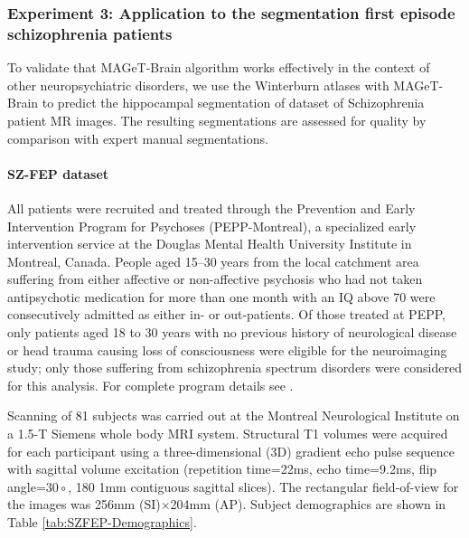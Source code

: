 \documentclass{article}\usepackage{graphicx, color}
\newcommand{\mb}{MAGeT-Brain }
\newcommand{\FEPdataset}{SZ-FEP }
\begin{document}
\subsubsection{Experiment 3: Application to the segmentation first episode
schizophrenia patients}
 
To validate that \mb algorithm works effectively in the context of other
neuropsychiatric disorders, we use the Winterburn atlases with \mb to predict
the hippocampal segmentation of dataset of Schizophrenia patient MR images. The
resulting segmentations are assessed for quality by comparison with expert
manual segmentations.

\paragraph{\FEPdataset dataset}
All patients were recruited and treated through the Prevention and Early
Intervention Program for Psychoses (PEPP-Montreal), a specialized early
intervention service at the Douglas Mental Health University Institute in
Montreal, Canada. People aged 15–30 years from the local catchment area
suffering from either affective or non-affective psychosis who had not taken
antipsychotic medication for more than one month with an IQ above 70 were
consecutively admitted as either in- or out-patients. Of those treated at PEPP,
only patients aged 18 to 30 years with no previous history of neurological
disease or head trauma causing loss of consciousness were eligible for the
neuroimaging study; only those suffering from schizophrenia spectrum disorders
were considered for this analysis.  For complete program details see
\citet{Malla2003}. 

Scanning of 81 subjects was carried out at the Montreal Neurological Institute
on a 1.5-T Siemens whole body MRI system.  Structural T1 volumes were acquired
for each participant using a three-dimensional (3D) gradient echo pulse sequence
with sagittal volume excitation (repetition time=22ms, echo time=9.2ms, flip
angle=$30{\circ}$, 180 1mm contiguous sagittal slices). The rectangular
field-of-view for the images was 256mm (SI)$\times$204mm (AP).  Subject
demographics are shown in Table \ref{tab:SZFEP-Demographics}. 
\end{document}
